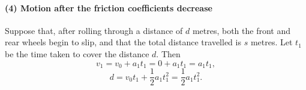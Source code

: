 \paragraph{(4) Motion after the friction coefficients decrease}

Suppose that, after rolling through a distance of $d$ metres, both the front and rear wheels begin to slip, and that the total distance travelled is $s$ metres. Let $t_1$ be the time taken to cover the distance $d$. Then
\[
v_1=v_0+a_1t_1=0+a_1t_1=a_1t_1,
\]
\[
d=v_0t_1+\frac{1}{2}a_1t_1^2=\frac{1}{2}a_1t_1^2.
\]

